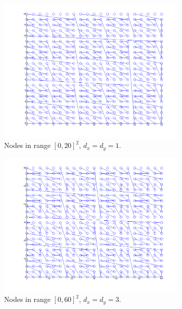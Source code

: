 \documentclass{report}
\begin{document}
\begin{figure}
\centering
\begin{subfigure}[t]{0.48\textwidth}
\centering
\includegraphics[width=\textwidth]{stencils_content/20x20.png}
\caption{Nodes in range $[0,20]^2$, $d_x = d_y = 1$.}
\label{fig:connor_works}
\end{subfigure}
\quad
\begin{subfigure}[t]{0.48\textwidth}
\centering
\includegraphics[width=\textwidth]{stencils_content/scale3.png}
\caption{Nodes in range $[0,60]^2$, $d_x = d_y = 3$.}
\label{fig:connor_works2}
\end{subfigure}
\begin{subfigure}[t]{0.48\textwidth}

\end{subfigure}
\end{figure}
\end{document}
